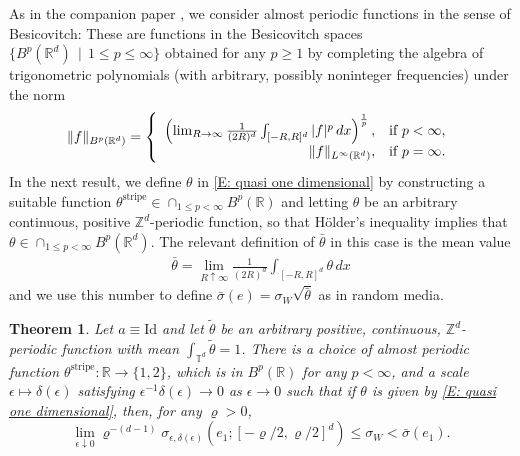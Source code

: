 \documentclass[10pt,a4paper]{amsart}
\newtheorem{theorem}{Theorem}
\begin{document}
As in the companion paper \cite{part1}, we consider almost periodic functions in the sense of Besicovitch: These are functions in the Besicovitch spaces $\{ B^{p}(\mathbb{R}^{d}) \, \mid \, 1 \leq p \leq \infty\}$ obtained for any $p \geq 1$ by completing the algebra of trigonometric polynomials (with arbitrary, possibly noninteger frequencies) under the norm
	\begin{align*}
		\| f \|_{B^{p}(\mathbb{R}^{d})} = \left\{ \begin{array}{r l}
									\left( \lim_{ R \to \infty} \frac{1}{(2R)^{d}} \int_{[-R,R]^{d}} |f|^{p} \, dx \right)^{\frac{1}{p}} , & \text{if} \, \, p < \infty, \\
									\|f\|_{L^{\infty}(\mathbb{R}^{d})}, & \text{if} \, \, p = \infty .
								\end{array} \right.
	\end{align*}
In the next result, we define $\theta$ in \eqref{E: quasi one dimensional} by constructing a suitable function $\theta^{\text{stripe}} \in \cap_{ 1 \leq p < \infty } B^{p}(\mathbb{R})$ and letting $\theta$ be an arbitrary continuous, positive $\mathbb{Z}^{d}$-periodic function, so that H\"{o}lder's inequality implies that $\theta \in \cap_{1 \leq p < \infty} B^{p}(\mathbb{R}^{d})$.  The relevant definition of $\bar{\theta}$ in this case is the mean value
	\begin{align} \label{E: mean value}
		\bar{\theta} = \lim_{ R \uparrow \infty } \frac{ 1 }{ (2R)^{d} } \int_{ [ -R, R ]^{ d } } \theta \, dx 
	\end{align}
and we use this number to define $\bar{\sigma}(e) = \sigma_{W} \sqrt{ \bar{\theta} }$ as in random media. 

	\begin{theorem} \label{T: almost periodic counterexample}Let $a \equiv \text{Id}$ and let $\tilde{\theta}$ be an arbitrary positive, continuous, $\mathbb{Z}^{d}$-periodic function with mean $\int_{\mathbb{T}^{d}} \tilde{\theta} = 1$. There is a choice of almost periodic function $\theta^{\text{stripe}} : \mathbb{R} \to \{1,2\}$, which is in $B^{p}(\mathbb{R})$ for any $p < \infty$, and a scale $\epsilon \mapsto \delta(\epsilon)$ satisfying $\epsilon^{-1} \delta(\epsilon) \to 0$ as $\epsilon \to 0$ such that  if $\theta$ is given by \eqref{E: quasi one dimensional}, then, for any $\varrho > 0$,
		\begin{equation} \label{E: almost periodic example equation}
			\lim_{\epsilon \downarrow 0} \varrho^{-(d-1)} \sigma_{\epsilon,\delta(\epsilon)}(e_{1}; [-\varrho/2,\varrho/2]^{d} ) \leq \sigma_{W}  < \bar{\sigma}(e_{1}).
		\end{equation}		
	\end{theorem}
\end{document}
